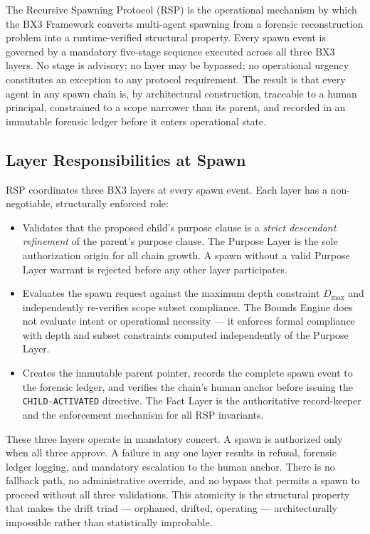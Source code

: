 \documentclass[12pt]{article}
\begin{document}
The Recursive Spawning Protocol (RSP) is the operational mechanism by which the BX3 Framework converts multi-agent spawning from a forensic reconstruction problem into a runtime-verified structural property. Every spawn event is governed by a mandatory five-stage sequence executed across all three BX3 layers. No stage is advisory; no layer may be bypassed; no operational urgency constitutes an exception to any protocol requirement. The result is that every agent in any spawn chain is, by architectural construction, traceable to a human principal, constrained to a scope narrower than its parent, and recorded in an immutable forensic ledger before it enters operational state.

\subsection{Layer Responsibilities at Spawn}

RSP coordinates three BX3 layers at every spawn event. Each layer has a non-negotiable, structurally enforced role:

\begin{itemize}
  \item[\textbf{Purpose Layer.}] Validates that the proposed child's purpose clause is a \emph{strict descendant refinement} of the parent's purpose clause. The Purpose Layer is the sole authorization origin for all chain growth. A spawn without a valid Purpose Layer warrant is rejected before any other layer participates.

  \item[\textbf{Bounds Engine.}] Evaluates the spawn request against the maximum depth constraint $D_{\max}$ and independently re-verifies scope subset compliance. The Bounds Engine does not evaluate intent or operational necessity — it enforces formal compliance with depth and subset constraints computed independently of the Purpose Layer.

  \item[\textbf{Fact Layer.}] Creates the immutable parent pointer, records the complete spawn event to the forensic ledger, and verifies the chain's human anchor before issuing the \texttt{CHILD-ACTIVATED} directive. The Fact Layer is the authoritative record-keeper and the enforcement mechanism for all RSP invariants.
\end{itemize}

These three layers operate in mandatory concert. A spawn is authorized only when all three approve. A failure in any one layer results in refusal, forensic ledger logging, and mandatory escalation to the human anchor. There is no fallback path, no administrative override, and no bypass that permits a spawn to proceed without all three validations. This atomicity is the structural property that makes the drift triad — orphaned, drifted, operating — architecturally impossible rather than statistically improbable.
\end{document}
